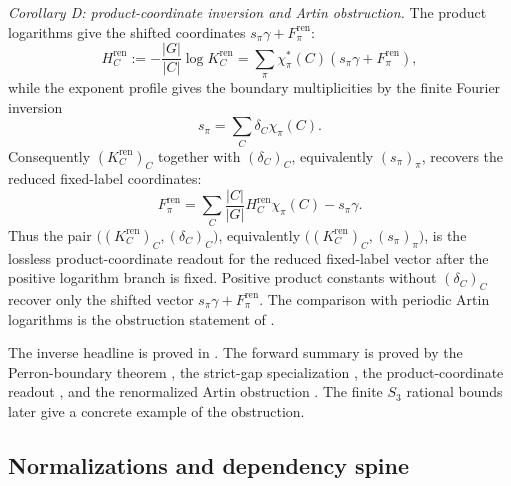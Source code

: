 \begin{theoremsummary}
  \emph{Corollary D: product-coordinate inversion and Artin obstruction.}
  The product logarithms give the shifted coordinates
  \(s_\pi\gamma+F_\pi^{\mathrm{ren}}\):
  \[
    H_C^{\mathrm{ren}}:=
    -\frac{|G|}{|C|}\log K_C^{\mathrm{ren}}
    =
    \sum_\pi \chi_\pi^\ast(C)(s_\pi\gamma+F_\pi^{\mathrm{ren}}),
  \]
  while the exponent profile gives the boundary multiplicities by the
  finite Fourier inversion
  \[
    s_\pi=\sum_C\delta_C\chi_\pi(C).
  \]
  Consequently \((K_C^{\mathrm{ren}})_C\) together with
  \((\delta_C)_C\), equivalently \((s_\pi)_\pi\), recovers the reduced
  fixed-label coordinates:
  \[
    F_\pi^{\mathrm{ren}}
    =
    \sum_C\frac{|C|}{|G|}
      H_C^{\mathrm{ren}}\chi_\pi(C)-s_\pi\gamma .
  \]
  Thus the pair
  \(\bigl((K_C^{\mathrm{ren}})_C,(\delta_C)_C\bigr)\), equivalently
  \(\bigl((K_C^{\mathrm{ren}})_C,(s_\pi)_\pi\bigr)\), is the lossless
  product-coordinate readout for the reduced fixed-label vector after the
  positive logarithm branch is fixed.  Positive product constants without
  \((\delta_C)_C\) recover only the shifted vector
  \(s_\pi\gamma+F_\pi^{\mathrm{ren}}\).  The comparison with periodic Artin
  logarithms is the obstruction statement of
  .
\end{theoremsummary}
The inverse headline is proved in
.
The forward summary is proved by the Perron-boundary theorem
, the strict-gap specialization
, the product-coordinate readout
, and the renormalized Artin
obstruction .  The finite \(S_3\)
rational bounds later give a concrete example of the obstruction.

\subsection{Normalizations and dependency spine}
\label{subsec:scope-normalizations-support}

